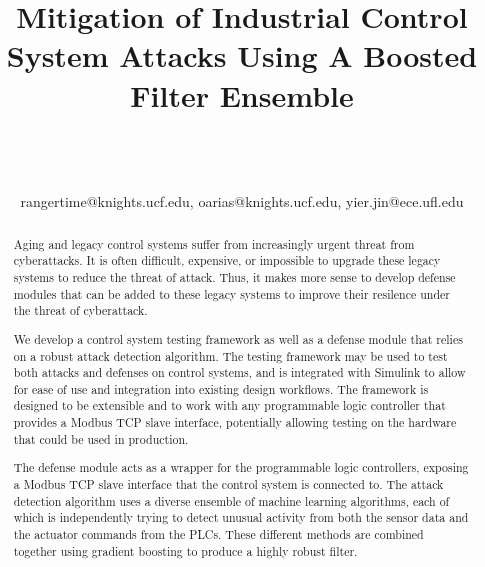 \documentclass[10pt,twocolumn]{IEEEtran}
\begin{document}
\title{Mitigation of Industrial Control System Attacks Using A Boosted Filter Ensemble}

\author{\\
\\
\\
{rangertime@knights.ucf.edu, oarias@knights.ucf.edu, yier.jin@ece.ufl.edu}\vspace{-0.16in}\vspace{-0.2in}}

\maketitle
\pagestyle{empty}
\thispagestyle{empty}

\begin{abstract}
Aging and legacy control systems suffer from increasingly urgent threat from cyberattacks.
It is often difficult, expensive, or impossible to upgrade these legacy systems to reduce the threat of attack.
Thus, it makes more sense to develop defense modules that can be added to these legacy systems to improve their resilence under the threat of cyberattack.

We develop a control system testing framework as well as a defense module that relies on a robust attack detection algorithm.
The testing framework may be used to test both attacks and defenses on control systems, and is integrated with Simulink to allow for ease of use and integration into existing design workflows.
The framework is designed to be extensible and to work with any programmable logic controller that provides a Modbus TCP slave interface, potentially allowing testing on the hardware that could be used in production.

The defense module acts as a wrapper for the programmable logic controllers, exposing a Modbus TCP slave interface that the control system is connected to.
The attack detection algorithm uses a diverse ensemble of machine learning algorithms, each of which is independently trying to detect unusual activity from both the sensor data and the actuator commands from the PLCs.
These different methods are combined together using gradient boosting to produce a highly robust filter.
\end{abstract}
\end{document}
